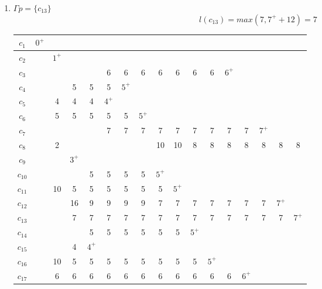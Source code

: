 \documentclass[12pt, a4paper] {ncc}
\begin{document}
\begin{enumerate}
	\item $\Gamma p = \{ c_{13}\}$
	$$l(c_{13}) = max(7, 7^+ + 12) = 7 $$
\begin{tabular} {|c|c|c|c|c|c|c|c|c|c|c|c|c|c|c|c|c|}
    \hline
    $c_{1}$  &$0^+$&      &     &     &     &     &     &      &     &     &     &     &     &      &     &    \\ \hline
    $c_{2}$  & \z  &$1^+$ &     &     &     &     &     &      &     &     &     &     &     &      &     &    \\ \hline
    $c_{3}$  & \z  & \z   & \z  &\z   & 6   &  6  &  6  &  6   & 6   & 6   & 6   &$6^+$&     &      &     &    \\ \hline
    $c_{4}$  & \z  & \z   & 5   & 5   & 5   &$5^+$&     &      &     &     &     &     &     &      &     &    \\ \hline
    $c_{5}$  & \z  & 4    & 4   & 4   &$4^+$&     &     &      &     &     &     &     &     &      &     &    \\ \hline
    $c_{6}$  & \z  & 5    & 5   & 5   & 5   &  5  &$5^+$&      &     &     &     &     &     &      &     &    \\ \hline
    $c_{7}$  & \z  & \z   & \z  & \z  & 7   &  7  &  7  &  7   & 7   & 7   & 7   &7    & 7   & $7^+$&     &       \\ \hline
    $c_{8}$  & \z  & 2    & \z  & \z  & \z  &  \z & \z  &  10  & 10  & 8   & 8   &8    & 8   &  8   & 8   & 8  \\ \hline
    $c_{9}$  & \z  & \z   &$3^+$&     &     &     &     &      &     &     &     &     &     &      &     &    \\ \hline
    $c_{10}$ & \z  & \z   & \z  & 5   & 5   &  5  &  5  &$5^+$ &     &     &     &     &     &      &     &    \\ \hline
    $c_{11}$ & \z  & 10   &  5  & 5   & 5   &  5  &  5  &  5   &$5^+$&     &     &     &     &      &     &    \\ \hline
    $c_{12}$ & \z  & \z   & 16  & 9   & 9   &  9  &  9  &  7   & 7   & 7   & 7   & 7   & 7   &  7   &$7^+$&        \\ \hline
    $c_{13}$ & \z  & \z   & 7   & 7   & 7   &  7  &  7  &  7   & 7   & 7   & 7   & 7   & 7   &  7   & 7   &$7^+$   \\ \hline
    $c_{14}$ & \z  & \z   & \z  & 5   & 5   &  5  &  5  &  5   & 5   &$5^+$&     &     &     &      &     &    \\ \hline
    $c_{15}$ & \z  & \z   & 4   &$4^+$&     &     &     &      &     &     &     &     &     &      &     &    \\ \hline
    $c_{16}$ & \z  & 10   & 5   & 5   & 5   &  5  &  5  &  5   & 5   & 5   &$5^+$&     &     &      &     &    \\ \hline
    $c_{17}$ & \z  & 6    & 6   & 6   & 6   &  6  &  6  &  6   & 6   & 6   & 6   & 6   &$6^+$&      &     &   \\ \hline 
\end{tabular}


\end{enumerate}
\end{document}
